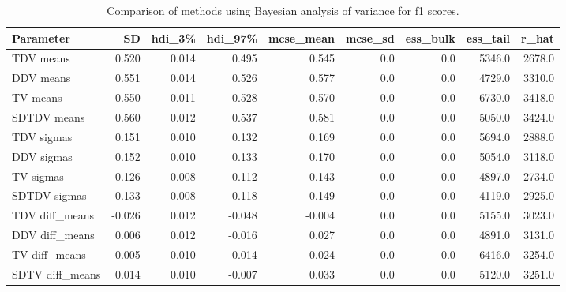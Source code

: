     
  \begin{table}[tb]
      \centering
      \caption{Comparison of methods using Bayesian analysis of variance for f1 scores.}
      \label{table:Comparison of methods using Bayesian analysis of variance for f1 scores.}
      \begin{tabular}{|l|r|r|r|r|r|r|r|r|}
          \hline
          Parameter        & SD     & hdi\_3\% & hdi\_97\% & mcse\_mean & mcse\_sd & ess\_bulk & ess\_tail & r\_hat \\
          \hline
          TDV means        & 0.520  & 0.014    & 0.495     & 0.545      & 0.0      & 0.0       & 5346.0    & 2678.0 \\
          \hline
          DDV means        & 0.551  & 0.014    & 0.526     & 0.577      & 0.0      & 0.0       & 4729.0    & 3310.0 \\
          \hline
          TV means         & 0.550  & 0.011    & 0.528     & 0.570      & 0.0      & 0.0       & 6730.0    & 3418.0 \\
          \hline
          SDTDV means      & 0.560  & 0.012    & 0.537     & 0.581      & 0.0      & 0.0       & 5050.0    & 3424.0 \\
          \hline
          TDV sigmas       & 0.151  & 0.010    & 0.132     & 0.169      & 0.0      & 0.0       & 5694.0    & 2888.0 \\
          \hline
          DDV sigmas       & 0.152  & 0.010    & 0.133     & 0.170      & 0.0      & 0.0       & 5054.0    & 3118.0 \\
          \hline
          TV sigmas        & 0.126  & 0.008    & 0.112     & 0.143      & 0.0      & 0.0       & 4897.0    & 2734.0 \\
          \hline
          SDTDV sigmas     & 0.133  & 0.008    & 0.118     & 0.149      & 0.0      & 0.0       & 4119.0    & 2925.0 \\
          \hline
          TDV diff\_means  & -0.026 & 0.012    & -0.048    & -0.004     & 0.0      & 0.0       & 5155.0    & 3023.0 \\
          \hline
          DDV diff\_means  & 0.006  & 0.012    & -0.016    & 0.027      & 0.0      & 0.0       & 4891.0    & 3131.0 \\
          \hline
          TV diff\_means   & 0.005  & 0.010    & -0.014    & 0.024      & 0.0      & 0.0       & 6416.0    & 3254.0 \\
          \hline
          SDTV diff\_means & 0.014  & 0.010    & -0.007    & 0.033      & 0.0      & 0.0       & 5120.0    & 3251.0 \\
          \hline
      \end{tabular} 
  \end{table}
  
